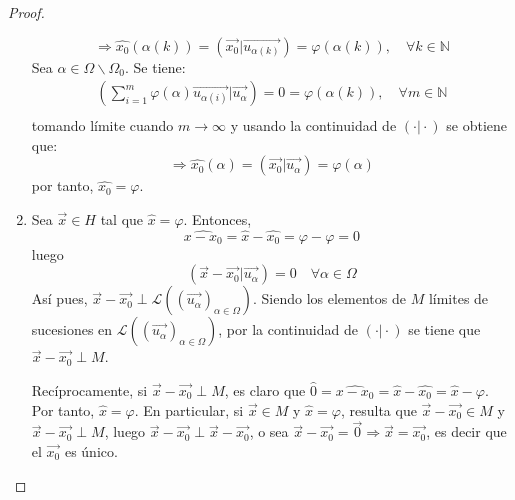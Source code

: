\documentclass[12pt]{report}
\newcounter{it}
\theoremstyle{largebreak}
\newcommand\pint[2]{\ensuremath{\left(#1\big| #2\right)}}
\begin{document}
\begin{proof}
\begin{enumerate}
            \begin{equation*}
                \Rightarrow \hat{x_0}(\alpha(k))=\pint{\vec{x_0}}{\vec{u_{\alpha(k)}}}=\varphi(\alpha(k)),\quad\forall k\in\mathbb{N}
            \end{equation*}
            Sea $\alpha\in\Omega\backslash\Omega_0$. Se tiene:
            \begin{equation*}
                \begin{split}
                    \pint{\sum_{i=1 }^{m}\varphi(\alpha)\vec{u_{\alpha(i)}}}{\vec{u_{\alpha}}}=0=\varphi(\alpha(k)),\quad\forall m\in\mathbb{N} \\
                \end{split}
            \end{equation*}
            tomando límite cuando $m\rightarrow\infty$ y usando la continuidad de $\pint{\cdot}{\cdot}$ se obtiene que:
            \begin{equation*}
                \Rightarrow \hat{x_0}(\alpha)=\pint{\vec{x_0}}{\vec{u_{\alpha}}}=\varphi(\alpha)
            \end{equation*}
            por tanto, $\hat{x_0}=\varphi$.

            \item Sea $\vec{x}\in H$ tal que $\hat{x}=\varphi$. Entonces,
            \begin{equation*}
                \widehat{x-x_0}=\hat{x}-\hat{x_0}=\varphi-\varphi=0
            \end{equation*}
            luego
            \begin{equation*}
                \pint{\vec{x}-\vec{x_0}}{\vec{u_\alpha}}=0\quad\forall\alpha\in\Omega
            \end{equation*}
            Así pues, $\vec{x}-\vec{x_0}\perp\mathcal{L}((\vec{u_\alpha})_{\alpha\in\Omega})$. Siendo los elementos de $M$ límites de sucesiones en $\mathcal{L}((\vec{u_\alpha})_{\alpha\in\Omega})$, por la continuidad de $\pint{\cdot}{\cdot}$ se tiene que $\vec{x}-\vec{x_0}\perp M$.

            Recíprocamente, si $\vec{x}-\vec{x_0}\perp M$, es claro que $\hat{0}=\widehat{x-x_0}=\hat{x}-\hat{x_0}=\hat{x}-\varphi$. Por tanto, $\hat{x}=\varphi$. En particular, si $\vec{x}\in M$ y $\hat{x}=\varphi$, resulta que $\vec{x}-\vec{x_0}\in M$ y $\vec{x}-\vec{x_0}\perp M$, luego $\vec{x}-\vec{x_0}\perp\vec{x}-\vec{x_0}$, o sea $\vec{x}-\vec{x_0}=\vec{0}\Rightarrow \vec{x}=\vec{x_0}$, es decir que el $\vec{x_0}$ es único.
        \end{enumerate}
    \end{proof}
 
\end{document}
